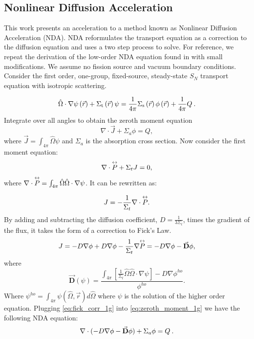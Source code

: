 \subsection{Nonlinear Diffusion Acceleration}
This work presents an acceleration to a method known as Nonlinear Diffusion Acceleration (NDA). NDA reformulates the transport equation as a correction to the diffusion equation and uses a two step process to solve. For reference, we repeat the derivation of the low-order NDA equation found in \cite{morel-holo} with small modifications. We assume no fission source and vacuum boundary conditions. Consider the first order, one-group, fixed-source, steady-state $S_N$ transport equation with isotropic scattering. 

  \begin{equation}
  \hat{\Omega}\cdot \nabla \psi \left(\vec{r}\right)+ \Sigma_{\mathrm{t}}\left(\vec{r}\right)\psi = \frac{1}{4 \pi} \Sigma_{\mathrm{s}}\left(\vec{r}\right) \phi\left(\vec{r}\right) + \frac{1}{4 \pi} Q\:.
  \end{equation}
Integrate over all angles to obtain the zeroth moment equation
\begin{equation}
  \nabla \cdot \vec{J} + \Sigma_a\phi  =  Q,
  \label{eq:zeroth_moment_1g}
  \end{equation}
where $\vec{J} = \int_{4\pi} \hat{\Omega}\psi$ and $\Sigma_a$ is the absorption cross section.   Now consider the first moment equation:
  \begin{equation}
  \nabla \cdot \overset{\text{\scriptsize$\leftrightarrow$}}{P} + \Sigma_t J = 0,
  \end{equation}
where $\nabla \cdot \overset{\text{\scriptsize$\leftrightarrow$}}{P} =  \int_{4\pi} \hat{\Omega} \hat{\Omega} \cdot \nabla \psi$. It can be rewritten as: 

  \begin{equation}
  J= -\frac{1}{\Sigma_t} \nabla \cdot \overset{\text{\scriptsize$\leftrightarrow$}}{P}. 
  \end{equation}
  By adding and subtracting the diffusion coefficient, $D = \frac{1}{3\Sigma_t}$, times the gradient of the flux, it takes the form of a correction to Fick's Law. 
  \begin{equation}
  J = -D \nabla \phi + D \nabla \phi - \frac{1}{\Sigma_t} \nabla \overset{\text{\scriptsize$\leftrightarrow$}}{P} \\
  = -D \nabla \phi - \vec{\textbf{D}} \phi,
  \label{eq:fick_corr_1g}
  \end{equation}
  where 
 \begin{equation}
  \vec{\textbf{D}} (\psi) = \frac{\int_{4\pi} [\frac{1}{\Sigma_t} \hat{\Omega} \hat{\Omega}\cdot \nabla \psi] - D \nabla \phi^{ho}}{\phi^{ho}}.
  \label{eq:drift_vector}
  \end{equation} 
Where $\psi^{ho} = \int_{4\pi} \psi(\hat{\Omega}, \vec{r}) d\hat{\Omega}$ where $\psi$ is the solution of the higher order equation. Plugging \eqref{eq:fick_corr_1g} into \eqref{eq:zeroth_moment_1g} we have the following NDA equation:
  \begin{equation}
  \nabla\cdot(-D \nabla \phi - \vec{\bf D} \phi) + \Sigma_a \phi = Q \:. \label{eq:NDA_1g}
  \end{equation}
  
